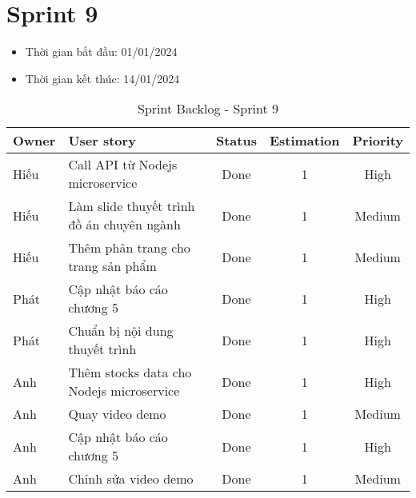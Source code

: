 \section{Sprint 9}
\begin{itemize}
    \item Thời gian bắt đầu: 01/01/2024
    \item Thời gian kết thúc: 14/01/2024
\end{itemize}
\begin{table}[H]
    \begin{tabular}{|m{2.5cm}|m{6cm}|c|c|c|}
    \hline
    \textbf{Owner}  & \textbf{User story}                                & \textbf{Status} & \textbf{Estimation} & \textbf{Priority} \\ \hline
    Hiếu               & Call API từ Nodejs microservice                    & Done            & 1                   & High         \\ \hline
    Hiếu              & Làm slide thuyết trình đồ án chuyên ngành                    & Done            & 1                   & Medium         \\ \hline
    Hiếu               & Thêm phân trang cho trang sản phẩm                    & Done            & 1                   & Medium         \\ \hline
    Phát               & Cập nhật báo cáo chương 5                    & Done            & 1                   & High        \\ \hline
    Phát               & Chuẩn bị nội dung thuyết trình                    & Done            & 1                   & High        \\ \hline
    Anh               & Thêm stocks data cho Nodejs microservice                   & Done            & 1                   & High        \\ \hline
    Anh               & Quay video demo                   & Done            & 1                   & Medium         \\ \hline
    Anh               & Cập nhật báo cáo chương 5                   & Done            & 1                   & High        \\ \hline
    Anh               & Chỉnh sửa video demo                   & Done            & 1                   & Medium         \\ \hline
    \end{tabular}
    \caption{Sprint Backlog - Sprint 9}
    \label{tab:sprint-9}
\end{table}
